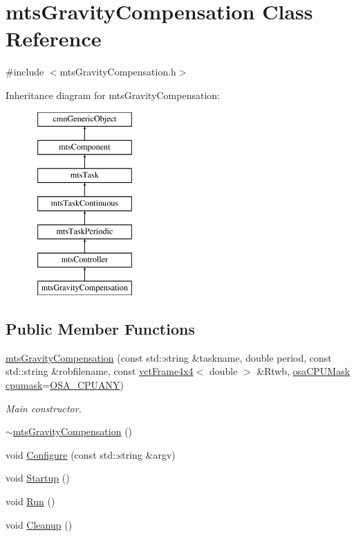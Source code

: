 \hypertarget{classmts_gravity_compensation}{\section{mts\-Gravity\-Compensation Class Reference}
\label{classmts_gravity_compensation}
}


{\ttfamily \#include $<$mts\-Gravity\-Compensation.\-h$>$}

Inheritance diagram for mts\-Gravity\-Compensation\-:\begin{figure}[H]
\begin{center}
\leavevmode
\includegraphics[height=7.000000cm]{d3/df8/classmts_gravity_compensation}
\end{center}
\end{figure}
\subsection*{Public Member Functions}
\begin{DoxyCompactItemize}
\item 
\hyperlink{classmts_gravity_compensation_a1b3a369e9f9633bc2634eb77a28f87db}{mts\-Gravity\-Compensation} (const std\-::string \&taskname, double period, const std\-::string \&robfilename, const \hyperlink{classvct_frame4x4}{vct\-Frame4x4}$<$ double $>$ \&Rtwb, \hyperlink{osa_c_p_u_affinity_8h_aaec7cdd7797e5e6eb5438c15fee5477a}{osa\-C\-P\-U\-Mask} \hyperlink{classmts_controller_a3125e5e9b65dc2347725215e8af73c9f}{cpumask}=\hyperlink{osa_c_p_u_affinity_8h_a2ae5ea257830cff2814d81ce526ada35}{O\-S\-A\-\_\-\-C\-P\-U\-A\-N\-Y})
\begin{DoxyCompactList}\small\item\em Main constructor. \end{DoxyCompactList}\item 
\hyperlink{classmts_gravity_compensation_a312a64260a6619fe8bf927dc2eeaf32a}{$\sim$mts\-Gravity\-Compensation} ()
\item 
void \hyperlink{classmts_gravity_compensation_afeb995f4fc2dcfa36f058d2daa4ca122}{Configure} (const std\-::string \&argv)
\item 
void \hyperlink{classmts_gravity_compensation_aa6d2d14d2980a33229624fa7462de7c3}{Startup} ()
\item 
void \hyperlink{classmts_gravity_compensation_a4434cc931c8e6069450b78b5ad83792d}{Run} ()
\item 
void \hyperlink{classmts_gravity_compensation_a207284822f031b9eef14414f77badbff}{Cleanup} ()
\end{DoxyCompactItemize}
